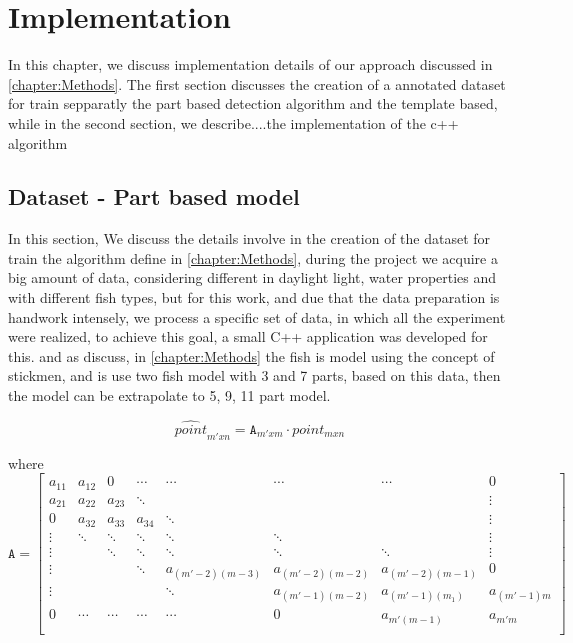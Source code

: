 \chapter{Implementation}
\label{chapter:Implementation}

In this chapter, we discuss implementation details of our approach discussed in 
\ref{chapter:Methods}. The first section discusses the creation of a annotated dataset 
for train sepparatly the part based detection algorithm and the template based, while 
in the second section, we describe....the implementation 
of the c++ algorithm 
 
 \section{Dataset - Part based model}
 In this section, We discuss the details involve in the creation of the dataset for
 train the algorithm define in \ref{chapter:Methods}, during the project we acquire
 a big amount of data, considering different in daylight light, water properties and
 with different fish types, but for this work, and due that the data preparation is 
 handwork intensely, we process a specific set of data, in which all the experiment
 were realized, to achieve this goal, a small C++ application was developed for this.
 and as discuss, in \ref{chapter:Methods} the fish is model using the concept of stickmen,
 and is use two fish model with 3 and 7 parts, based on this data, then the model can be 
 extrapolate to 5, 9, 11 part model.


\begin{equation}
\hat{point}_{m'xn} =\mathtt{A}_{m'xm} \cdot point_{mxn}
\end{equation}

where
 \begin{equation}
 \label{eq:extrapole}
\mathtt{A} =
\begin{bmatrix}
a_{11}  & a_{12}  & 0 & \cdots & \cdots & \cdots & \cdots & 0 \\
a_{21}  & a_{22}  & a_{23}  & \ddots & && & \vdots \\
0 & a_{32}  & a_{33} & a_{34}  & \ddots & &  & \vdots \\
\vdots & \ddots & \ddots & \ddots & \ddots & \ddots &  & \vdots \\
\vdots & & \ddots & \ddots & \ddots & \ddots & \ddots& \vdots\\
\vdots  &  & & \ddots & a_{(m'-2)(m-3)}  & a_{(m'-2)(m-2)}  &  a_{(m'-2)(m-1)}  & 0\\
\vdots  &  & & & \ddots & a_{(m'-1)(m-2)}  & a_{(m'-1)(m_1)}  &  a_{(m'-1)m}\\
0 & \cdots &  \cdots & \cdots & \cdots & 0 & a_{m'(m-1)} & a_{m'm}  \\
\end{bmatrix}
 \end{equation}


